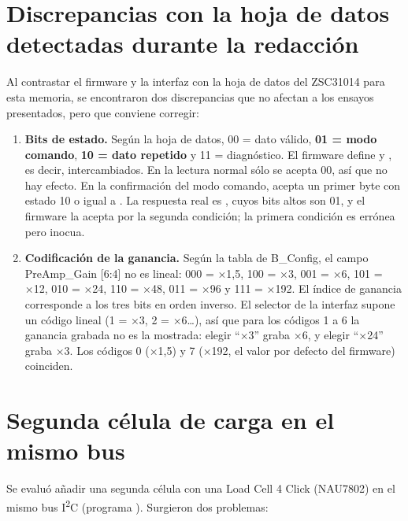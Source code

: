 \section{Discrepancias con la hoja de datos detectadas durante la redacción}
\label{sec:prob-estado}

Al contrastar el firmware y la interfaz con la hoja de datos del ZSC31014 para esta memoria, se
encontraron dos discrepancias que no afectan a los ensayos presentados, pero que conviene corregir:

\begin{enumerate}
  \item \textbf{Bits de estado.} Según la hoja de datos, 00 = dato válido, \textbf{01 = modo comando},
        \textbf{10 = dato repetido} y 11 = diagnóstico. El firmware define
         y , es decir, intercambiados. En la
        lectura normal sólo se acepta 00, así que no hay efecto. En la confirmación del modo comando,
         acepta un primer byte con estado 10 o igual a . La respuesta
        real es , cuyos bits altos son 01, y el firmware la acepta por la segunda
        condición; la primera condición es errónea pero inocua.
  \item \textbf{Codificación de la ganancia.} Según la tabla de B\_Config, el campo PreAmp\_Gain [6:4]
        no es lineal: 000 = ×1,5, 100 = ×3, 001 = ×6, 101 = ×12, 010 = ×24, 110 = ×48, 011 = ×96 y
        111 = ×192. El índice de ganancia corresponde a los tres bits en orden inverso. El selector de
        la interfaz supone un código lineal (1 = ×3, 2 = ×6\ldots), así que para los códigos 1 a 6 la
        ganancia grabada no es la mostrada: elegir ``×3'' graba ×6, y elegir ``×24'' graba ×3. Los
        códigos 0 (×1,5) y 7 (×192, el valor por defecto del firmware) coinciden.
\end{enumerate}

\section{Segunda célula de carga en el mismo bus}
\label{sec:prob-nau}

Se evaluó añadir una segunda célula con una Load Cell 4 Click (NAU7802) en el mismo bus
I\textsuperscript{2}C (programa ). Surgieron dos problemas:

